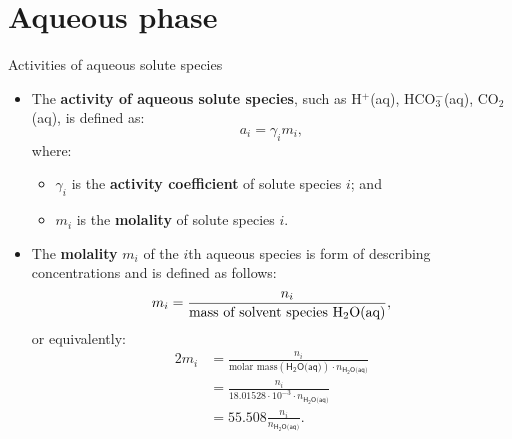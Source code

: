 %
\section{Aqueous phase}
%
%
%
\begin{frame}{Activities of aqueous solute species}
%
\lcol
\begin{itemize}
\item The \alert{\textbf{activity of aqueous solute species}}, such as H$^{+}$(aq), HCO$_{3}^{-}$(aq),
CO$_{2}$(aq), is defined as:
\[
a_{i}=\gamma_{i}m_{i},
\]
where:
\begin{itemize}
\item $\gamma_{i}$ is the \textbf{activity coefficient} of solute species
$i$; and
\item $m_{i}$ is the \textbf{molality} of solute species $i$.	
\end{itemize}
\end{itemize}
\rcol
\pause
\begin{itemize}
\item The  \alert{\textbf{molality}} $m_{i}$ of the $i$th aqueous species is form of describing concentrations and is defined as follows:
\[
m_{i}=\frac{n_{i}}{\text{mass of solvent species H\ensuremath{_{2}}O(aq)}},
\]
or equivalently:
\begin{alignat*}{2}
m_{i} & =  \frac{n_{i}}{\mbox{molar mass}(\mathsf{H_{2}O\text{(aq)}}) \cdot n_{\mathsf{H_{2}O\text{(aq)}}}} \\
         & =  \frac{n_{i}}{18.01528 \cdot 10^{-3} \cdot  n_{\mathsf{H_{2}O\text{(aq)}}}} \\
         & = 55.508\frac{n_{i}}{n_{\mathsf{H_{2}O\text{(aq)}}}}.
\end{alignat*}
\end{itemize}
\ecol
\end{frame}
%
